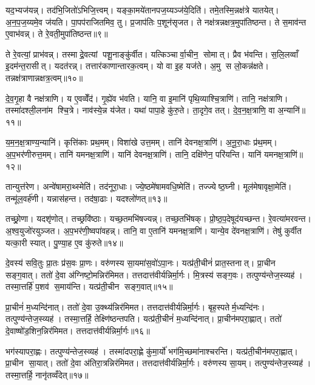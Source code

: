 यद॒भ्यज॑यन्न्। तद॑भि॒जितो॑ऽभिजि॒त्त्वम्। यङ्का॒मये॑तानपज॒य्यञ्ज॑ये॒दिति॑। तमे॒तस्मि॒न्नक्ष॑त्रे यातयेत्। अ॒न॒प॒ज॒य्यमे॒व ज॑यति। पा॒पप॑राजितमिव॒ तु। प्र॒जाप॑तिः प॒शून॑सृजत। ते नक्ष॑त्रन्नक्षत्र॒मुपा॑तिष्ठन्त। ते स॒माव॑न्त ए॒वाभ॑वन्न्। ते रे॒वती॒मुपा॑तिष्ठन्त॥९॥

ते रे॒वत्यां॒ प्राभ॑वन्न्। तस्माद्रे॒वत्यां पशू॒नाङ्कु॑र्वीत। यत्किञ्चार्वा॒चीन॒ सोमात्। प्रैव भ॑वन्ति। स॒लि॒लव्वाँ इ॒दम॑न्त॒रासीत्। यदत॑रन्न्। तत्तार॑काणान्तारक॒त्वम्। यो वा इ॒ह यज॑ते। अ॒मु स लो॒कन्न॑क्षते। तन्नक्ष॑त्राणान्नक्षत्र॒त्वम्॥१०॥

दे॒व॒गृ॒हा वै नक्ष॑त्राणि। य ए॒वव्वेँद॑। गृ॒ह्ये॑व भ॑वति। यानि॒ वा इ॒मानि॑ पृथि॒व्याश्चि॒त्राणि॑। तानि॒ नक्ष॑त्राणि। तस्मा॑दश्ली॒लना॑म श्चि॒त्रे। नाव॑स्ये॒न्न य॑जेत। यथा॑ पापा॒हे कु॑रु॒ते। ता॒दृगे॒व तत्। दे॒व॒न॒क्ष॒त्राणि॒ वा अ॒न्यानि॑॥११॥

य॒म॒न॒क्ष॒त्राण्य॒न्यानि॑। कृत्ति॑काः प्रथ॒मम्। विशा॑खे उत्त॒मम्। तानि॑ देवनक्ष॒त्राणि॑। अ॒नू॒रा॒धाः प्र॑थ॒मम्। अ॒प॒भर॑णीरुत्त॒मम्। तानि॑ यमनक्ष॒त्राणि॑। यानि॑ देवनक्ष॒त्राणि॑। तानि॒ दक्षि॑णेन॒ परि॑यन्ति। यानि॑ यमनक्ष॒त्राणि॑॥१२॥

तान्युत्त॑रेण। अन्वे॑षामरा॒थ्स्मेति॑। तद॑नूरा॒धाः। ज्ये॒ष्ठमे॑षामवधि॒ष्मेति॑। तज्ज्येष्ठ॒घ्नी। मूल॑मेषावृक्षा॒मेति॑। तन्मू॑ल॒वर्\mbox{}ह॑णी। यन्नास॑हन्त। तद॑षा॒ढाः। यदश्लो॑णत्॥१३॥

तच्छ्रो॒णा। यदशृ॑णोत्। तच्छ्रवि॑ष्ठाः। यच्छ॒तमभि॑षज्यन्न्। तच्छ॒तभि॑षक्। प्रो॒ष्ठ॒प॒देषूद॑यच्छन्त। रे॒वत्या॑मरवन्त। अ॒श्व॒युजो॑रयुञ्जत। अ॒प॒भर॑णी॒ष्वपा॑वहन्न्। तानि॒ वा ए॒तानि॑ यमनक्ष॒त्राणि॑। यान्ये॒व दे॑वनक्ष॒त्राणि॑। तेषु॑ कुर्वीत यत्का॒री स्यात्। पु॒ण्या॒ह ए॒व कु॑रुते॥१४॥

दे॒वस्य॑ सवि॒तुः प्रा॒तः प्र॑स॒वः प्रा॒णः। वरु॑णस्य सा॒यमा॑स॒वो॑ऽपा॒नः। यत्प्र॑ती॒चीनं॑ प्रात॒स्तनात्। प्रा॒चीन सङ्ग॒वात्। ततो॑ दे॒वा अ॑ग्निष्टो॒मन्निर॑मिमत। तत्तदात्त॑वीर्यन्निर्मा॒र्गः। मि॒त्रस्य॑ सङ्ग॒वः। तत्पुण्य॑न्तेज॒स्व्यह॑। तस्मा॒त्तर्\mbox{}हि॑ प॒शव॑ स॒माय॑न्ति। यत्प्र॑ती॒चीन सङ्ग॒वात्॥१५॥

प्रा॒चीनं॑ म॒ध्यन्दि॑नात्। ततो॑ दे॒वा उ॒क्थ्य॑न्निर॑मिमत। तत्तदात्त॑वीर्यन्निर्मा॒र्गः। बृह॒स्पतेर्म॒ध्यन्दि॑नः। तत्पुण्य॑न्तेज॒स्व्यह॑। तस्मा॒त्तर्\mbox{}हि॒ तेक्ष्णि॑ष्ठन्तपति। यत्प्र॑ती॒चीनं॑ म॒ध्यन्दि॑नात्। प्रा॒चीन॑मपरा॒ह्णात्। ततो॑ दे॒वाष्षो॑ड॒शिन॒न्निर॑मिमत। तत्तदात्त॑वीर्यन्निर्मा॒र्गः॥१६॥

भग॑स्यापरा॒ह्णः। तत्पुण्य॑न्तेज॒स्व्यह॑। तस्मा॑दपरा॒ह्णे कु॑मा॒र्यो॑ भग॑मि॒च्छमा॑नाश्चरन्ति। यत्प्र॑ती॒चीन॑मपरा॒ह्णात्। प्रा॒चीन सा॒यात्। ततो॑ दे॒वा अ॑तिरा॒त्रन्निर॑मिमत। तत्तदात्त॑वीर्यन्निर्मा॒र्गः। वरु॑णस्य सा॒यम्। तत्पुण्य॑न्तेज॒स्व्यह॑। तस्मा॒त्तर्\mbox{}हि॒ नानृ॑तव्वँदेत्॥१७॥

